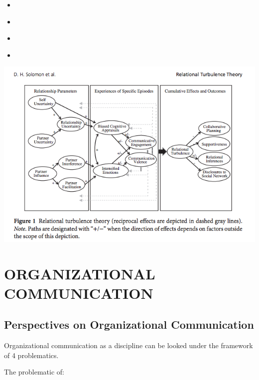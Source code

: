 \documentclass[
]{book}
\begin{document}
\begin{itemize}
  \begin{itemize}
  \item
    \citep{Solomon_2016}
  \item
    \citep{Theiss_2013}
  \item
    \citep{Tian_2020}
  \item
    \citep{Harvey_Knowles_2015}
  \end{itemize}
\end{itemize}

\href{https://onlinelibrary.wiley.com/doi/epdf/10.1111/hcre.12091}{\includegraphics{images/Relational_Turbulence_Theory.png}}

\citep[pp.509]{Solomon_2016}

\hypertarget{part-organizational-communication}{%
\part{ORGANIZATIONAL COMMUNICATION}\label{part-organizational-communication}}

\hypertarget{perspectives-on-organizational-communication}{%
\chapter{Perspectives on Organizational Communication}\label{perspectives-on-organizational-communication}}

\citep{Mumby_1996}
Organizational communication as a discipline can be looked under the framework of 4 problematics.

The problematic of:
\end{document}

